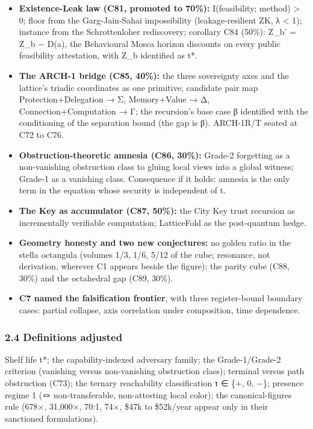 \documentclass[
]{article}
\providecommand{\tightlist}{%
  \setlength{\itemsep}{0pt}\setlength{\parskip}{0pt}}
\begin{document}
\begin{itemize}
\tightlist
\item
  \textbf{Existence-Leak law (C81, promoted to 70\%):} I(feasibility;
  method) \textgreater{} 0; floor from the Garg-Jain-Sahai impossibility
  (leakage-resilient ZK, λ \textless{} 1); instance from the
  Schrottenloher rediscovery; corollary C84 (50\%): Z\_b' = Z\_b − D(a),
  the Behavioural Mosca horizon discounts on every public feasibility
  attestation, with Z\_b identified as t*.
\item
  \textbf{The ARCH-1 bridge (C85, 40\%):} the three sovereignty axes and
  the lattice's triadic coordinates as one primitive; candidate pair map
  Protection+Delegation → Σ, Memory+Value → Δ, Connection+Computation →
  Γ; the recursion's base case β identified with the conditioning of the
  separation bound (the gap is β). ARCH-1R/T seated at C72 to C76.
\item
  \textbf{Obstruction-theoretic amnesia (C86, 30\%):} Grade-2 forgetting
  as a non-vanishing obstruction class to gluing local views into a
  global witness; Grade-1 as a vanishing class. Consequence if it holds:
  amnesia is the only term in the equation whose security is independent
  of t.
\item
  \textbf{The Key as accumulator (C87, 50\%):} the City Key trust
  recursion as incrementally verifiable computation; LatticeFold as the
  post-quantum hedge.
\item
  \textbf{Geometry honesty and two new conjectures:} no golden ratio in
  the stella octangula (volumes 1/3, 1/6, 5/12 of the cube; resonance,
  not derivation, wherever C1 appears beside the figure); the parity
  cube (C88, 30\%) and the octahedral gap (C89, 30\%).
\item
  \textbf{C7 named the falsification frontier}, with three
  register-bound boundary cases: partial collapse, axis correlation
  under composition, time dependence.
\end{itemize}

\subsubsection{2.4 Definitions adjusted}\label{definitions-adjusted}

Shelf life t*; the capability-indexed adversary family; the
Grade-1/Grade-2 criterion (vanishing versus non-vanishing obstruction
class); terminal versus path obstruction (C73); the ternary reachability
classification τ ∈ \{+, 0, −\}; presence regime 1 (🪢 non-transferable,
non-attesting local color); the canonical-figures rule (678×, 31,000×,
70:1, 74×, \$47k to \$52k/year appear only in their sanctioned
formulations).
\end{document}
